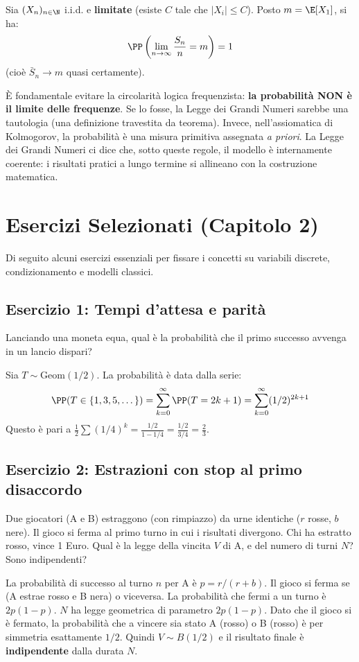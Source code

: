 \begin{theorem}
Sia $(X_n)_{n \in \N}$ i.i.d. e \textbf{limitate} (esiste $C$ tale che $|X_i| \le C$). Posto $m = \E[X_1]$, si ha:
\[ \PP\left( \lim_{n\to\infty} \frac{S_n}{n} = m \right) = 1 \]
(cioè $\bar{S}_n \to m$ quasi certamente).
\end{theorem}

\begin{hint}
È fondamentale evitare la circolarità logica frequenzista: \textbf{la probabilità NON è il limite delle frequenze}. Se lo fosse, la Legge dei Grandi Numeri sarebbe una tautologia (una definizione travestita da teorema).
Invece, nell'assiomatica di Kolmogorov, la probabilità è una misura primitiva assegnata \emph{a priori}. La Legge dei Grandi Numeri ci dice che, sotto queste regole, il modello è internamente coerente: i risultati pratici a lungo termine si allineano con la costruzione matematica.
\end{hint}

\section{Esercizi Selezionati (Capitolo 2)}

Di seguito alcuni esercizi essenziali per fissare i concetti su variabili discrete, condizionamento e modelli classici.

\subsection*{Esercizio 1: Tempi d'attesa e parità}
Lanciando una moneta equa, qual è la probabilità che il primo successo avvenga in un lancio dispari?
\begin{spiegazione}
Sia $T \sim \text{Geom}(1/2)$. La probabilità è data dalla serie:
\[ \PP(T \in \{1,3,5,\dots\}) = \sum_{k=0}^\infty \PP(T = 2k+1) = \sum_{k=0}^\infty (1/2)^{2k+1} \]
Questo è pari a $\frac{1}{2} \sum (1/4)^k = \frac{1/2}{1 - 1/4} = \frac{1/2}{3/4} = \frac{2}{3}$.
\end{spiegazione}

\subsection*{Esercizio 2: Estrazioni con stop al primo disaccordo}
Due giocatori (A e B) estraggono (con rimpiazzo) da urne identiche ($r$ rosse, $b$ nere). Il gioco si ferma al primo turno in cui i risultati divergono. Chi ha estratto rosso, vince 1 Euro. Qual è la legge della vincita $V$ di A, e del numero di turni $N$? Sono indipendenti?
\begin{spiegazione}
La probabilità di successo al turno $n$ per A è $p = r/(r+b)$. Il gioco si ferma se (A estrae rosso e B nera) o viceversa. La probabilità che fermi a un turno è $2p(1-p)$.
$N$ ha legge geometrica di parametro $2p(1-p)$.
Dato che il gioco si è fermato, la probabilità che a vincere sia stato A (rosso) o B (rosso) è per simmetria esattamente $1/2$.
Quindi $V \sim B(1/2)$ e il risultato finale è \textbf{indipendente} dalla durata $N$.
\end{spiegazione}

